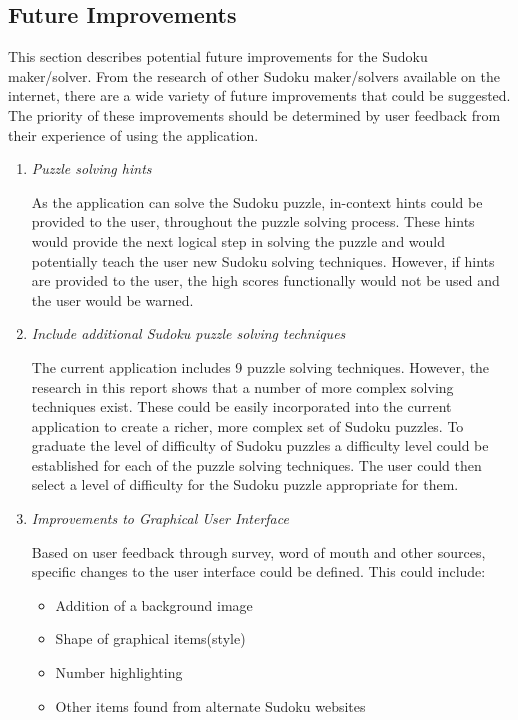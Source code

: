 \documentclass[fleqn]{article}
\begin{document}
\subsection{Future Improvements}

This section describes potential future improvements for the Sudoku maker/solver. From the research of other Sudoku maker/solvers available on the internet, there are a wide variety of future improvements that could be suggested. The priority of these improvements should be determined by user feedback from their experience of using the application.  
\begin{enumerate}


\item{\textit{Puzzle solving hints}}

As the application can solve the Sudoku puzzle, in-context hints could be provided to the user, throughout the puzzle solving process. These hints would provide the next logical step in solving the puzzle and would potentially teach the user new Sudoku solving techniques. However, if hints are provided to the user, the high scores functionally would not be used and the user would be warned. 

\item{\textit{Include additional Sudoku puzzle solving techniques}}

The current application includes 9 puzzle solving techniques. However, the research in this report shows that a number of more complex solving techniques exist. These could be easily incorporated into the current application to create a richer, more complex set of Sudoku puzzles.
To graduate the level of difficulty of Sudoku puzzles a difficulty level could be established for each of the puzzle solving techniques. The user could then select a level of difficulty for the Sudoku puzzle appropriate for them.


\item{\textit{Improvements to Graphical User Interface}}

Based on user feedback through survey, word of mouth and other sources, specific changes to the user interface could be defined. This could include:
\begin{itemize}
\item{Addition of a background image}
\item{Shape of graphical items(style)}
\item{Number highlighting}
\item{Other items found from alternate Sudoku websites}
\end{itemize}  


\end{enumerate}
\end{document}

